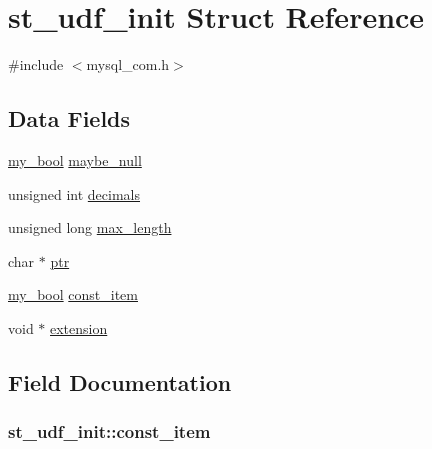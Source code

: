 \hypertarget{structst__udf__init}{}\section{st\+\_\+udf\+\_\+init Struct Reference}
\label{structst__udf__init}


{\ttfamily \#include $<$mysql\+\_\+com.\+h$>$}

\subsection*{Data Fields}
\begin{DoxyCompactItemize}
\item 
\hyperlink{mysql_8h_a74cd599039dcf29c6e6d342cf4efd0a8}{my\+\_\+bool} \hyperlink{structst__udf__init_a71054469fdef17b80268a94562318060}{maybe\+\_\+null}
\item 
unsigned int \hyperlink{structst__udf__init_aca2f114c18f57900974f81ae62a5543a}{decimals}
\item 
unsigned long \hyperlink{structst__udf__init_a60d9ca1caa23f0c5328403d1e9c607d7}{max\+\_\+length}
\item 
char $\ast$ \hyperlink{structst__udf__init_a9fb5360f7a0f4b9e952024161ced16b5}{ptr}
\item 
\hyperlink{mysql_8h_a74cd599039dcf29c6e6d342cf4efd0a8}{my\+\_\+bool} \hyperlink{structst__udf__init_a832983535eee39f61ec79dd6c79a5baa}{const\+\_\+item}
\item 
void $\ast$ \hyperlink{structst__udf__init_ab2cbc7921ecfcf5e714e2099599a371d}{extension}
\end{DoxyCompactItemize}


\subsection{Field Documentation}
\hypertarget{structst__udf__init_a832983535eee39f61ec79dd6c79a5baa}{}
\subsubsection[{const\+\_\+item}]{ st\+\_\+udf\+\_\+init\+::const\+\_\+item}\label{structst__udf__init_a832983535eee39f61ec79dd6c79a5baa}
\hypertarget{structst__udf__init_aca2f114c18f57900974f81ae62a5543a}{}
